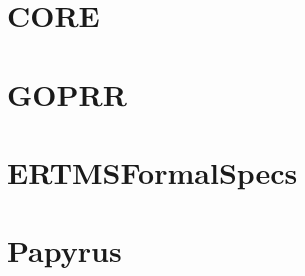 \documentclass{template/openetcs_report}
\begin{document}
\newenvironment{justif}{
        \begin{quote}
        \begin{itshape}Justification.
}{
        \end{itshape}
        \end{quote}
}


\newenvironment{author_comment}{
        \begin{quote}
        \begin{itshape}\textcolor{green}{Author.}
}{
        \end{itshape}
        \end{quote}
}


\newenvironment{assessor1}{
        \begin{quote}
        \begin{itshape} \textcolor{blue}{Assessor 1.}
}{
        \end{itshape}
        \end{quote}
}


\newenvironment{assessor2}{
        \begin{quote}
        \begin{itshape}\textcolor{magenta}{Assessor 2.}
}{
        \end{itshape}
        \end{quote}
}


\def\reqt{R-WP2/D2.3.0}








\appendix

\chapter{CORE}
\tbd

\chapter{GOPRR}
\tbd

\chapter{ERTMSFormalSpecs}
\tbd

\chapter{Papyrus}
\tbd
\end{document}
